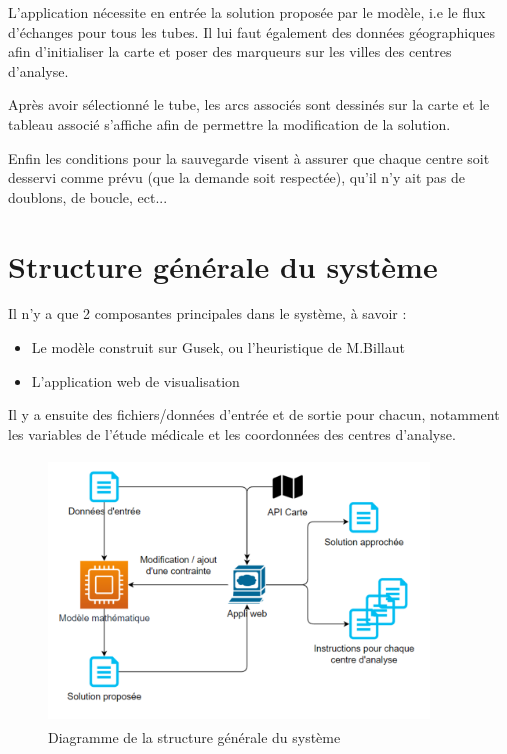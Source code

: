 \documentclass{polytech/polytech}
\numberwithin{figure}{chapter}
\begin{document}
L'application nécessite en entrée la solution proposée par le modèle, i.e le flux d'échanges pour tous les tubes. Il lui faut également des données géographiques afin d'initialiser la carte et poser des marqueurs sur les villes des centres d'analyse.

Après avoir sélectionné le tube, les arcs associés sont dessinés sur la carte et le tableau associé s'affiche afin de permettre la modification de la solution.

Enfin les conditions pour la sauvegarde visent à assurer que chaque centre soit desservi comme prévu (que la demande soit respectée), qu'il n'y ait pas de doublons, de boucle, ect...

\section{Structure générale du système}

Il n'y a que 2 composantes principales dans le système, à savoir : 
\begin{itemize}
    \item Le modèle construit sur Gusek, ou l'\gls{heuristique} de M.Billaut
    \item L'application web de visualisation
\end{itemize}

Il y a ensuite des fichiers/données d'entrée et de sortie pour chacun, notamment les variables de l'étude médicale et les coordonnées des centres d'analyse.

\begin{figure}[h!]
    \centering
    \includegraphics[width=0.9\textwidth, height=7cm]{pic/structuresysteme.png}
    \caption{Diagramme de la structure générale du système}
    \label{Diagramme de la structure générale du système}
\end{figure}
\end{document}
